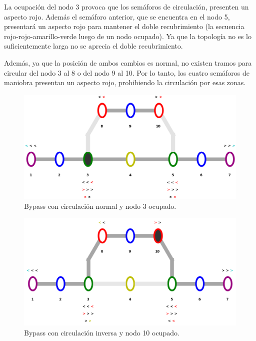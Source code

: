 	La ocupación del nodo 3 provoca que los semáforos de circulación, presenten un aspecto rojo. Además el semáforo anterior, que se encuentra en el nodo 5, presentará un aspecto rojo para mantener el doble recubrimiento (la secuencia rojo-rojo-amarillo-verde luego de un nodo ocupado). Ya que la topología no es lo suficientemente larga no se aprecia el doble recubrimiento.
	
	Además, ya que la posición de ambos cambios es normal, no existen tramos para circular del nodo 3 al 8 o del nodo 9 al 10. Por lo tanto, los cuatro semáforos de maniobra presentan un aspecto rojo, prohibiendo la circulación por esas zonas.
	
	\begin{figure}[h]
	\centering
	\includegraphics[scale=0.4]{./Figures/Mapa_A}
		\caption{Bypass con circulación normal y nodo 3 ocupado.}
		\label{fig:Bypass_5}
	\end{figure}
	
	\vspace{5cm}
	
	\begin{figure}[h]
	\centering
	\includegraphics[scale=0.4]{./Figures/Mapa_B}
		\caption{Bypass con circulación inversa y nodo 10 ocupado.}
		\label{fig:Bypass_6}
	\end{figure}
	
